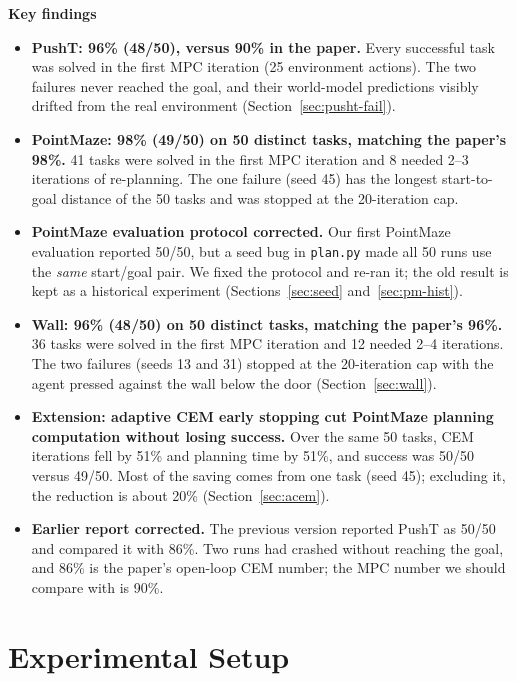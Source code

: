 \documentclass[11pt]{article}
\begin{document}
\textbf{Key findings}
\begin{itemize}
  \item \textbf{PushT: 96\% (48/50), versus 90\% in the paper.} Every successful
        task was solved in the first MPC iteration (25 environment actions).
        The two failures never reached the goal, and their world-model
        predictions visibly drifted from the real environment
        (Section~\ref{sec:pusht-fail}).
  \item \textbf{PointMaze: 98\% (49/50) on 50 distinct tasks, matching the
        paper's 98\%.} 41 tasks were solved in the first MPC iteration and 8
        needed 2--3 iterations of re-planning. The one failure (seed 45) has
        the longest start-to-goal distance of the 50 tasks and was stopped at
        the 20-iteration cap.
  \item \textbf{PointMaze evaluation protocol corrected.} Our first PointMaze
        evaluation reported 50/50, but a seed bug in \texttt{plan.py} made all
        50 runs use the \emph{same} start/goal pair. We fixed the protocol and
        re-ran it; the old result is kept as a historical experiment
        (Sections~\ref{sec:seed} and~\ref{sec:pm-hist}).
  \item \textbf{Wall: 96\% (48/50) on 50 distinct tasks, matching the paper's
        96\%.} 36 tasks were solved in the first MPC iteration and 12 needed
        2--4 iterations. The two failures (seeds 13 and 31) stopped at the
        20-iteration cap with the agent pressed against the wall below the
        door (Section~\ref{sec:wall}).
  \item \textbf{Extension: adaptive CEM early stopping cut PointMaze planning
        computation without losing success.} Over the same 50 tasks, CEM
        iterations fell by 51\% and planning time by 51\%, and success was
        50/50 versus 49/50. Most of the saving comes from one task (seed 45);
        excluding it, the reduction is about 20\% (Section~\ref{sec:acem}).
  \item \textbf{Earlier report corrected.} The previous version reported
        PushT as 50/50 and compared it with 86\%. Two runs had crashed without
        reaching the goal, and 86\% is the paper's open-loop CEM number; the
        MPC number we should compare with is 90\%.
\end{itemize}

\section{Experimental Setup}
\end{document}
